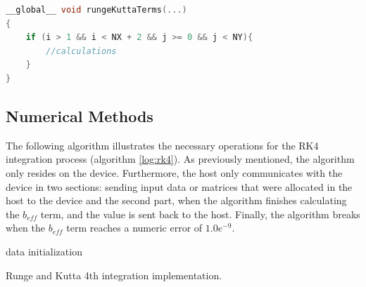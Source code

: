 \begin{lstlisting}[language=C++, label={lst:if}, caption={Limits the threads executing inside a kernel.}]
__global__ void rungeKuttaTerms(...)
{
    if (i > 1 && i < NX + 2 && j >= 0 && j < NY){
    	//calculations
    }
}
\end{lstlisting}

\subsection{Numerical Methods}

The following algorithm illustrates the necessary operations for the RK4 integration process (algorithm \ref{log:rk4}). As previously mentioned, the algorithm only resides on the device. Furthermore, the host only communicates with the device in two sections: sending input data or matrices that were allocated in the host to the device and the second part, when the algorithm finishes calculating the $b_{eff}$ term, and the value is sent back to the host. Finally, the algorithm breaks when the $b_{eff}$ term reaches a numeric error of $1.0e^{-9}$.

\begin{algorithm}[H]
 data initialization\;
 \label{log:rk4}
 \caption{Runge and Kutta 4th integration implementation.}
\end{algorithm}

